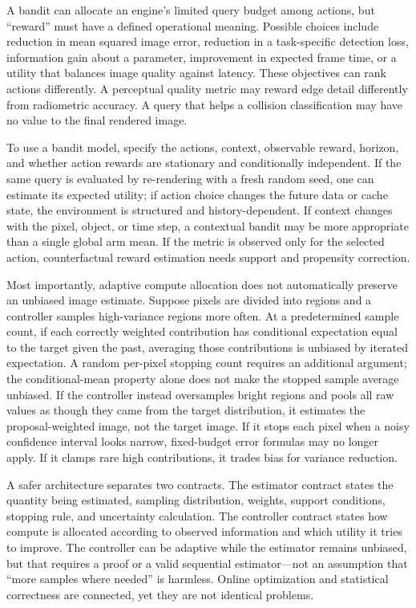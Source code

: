 \hypertarget{02-foundations-ii-ch029-a-compute-budget-needs-a-reward-that-matches-the-real-goal}{}

A bandit can allocate an engine's limited query budget among actions, but ``reward'' must have a defined operational meaning. Possible choices include reduction in mean squared image error, reduction in a task-specific detection loss, information gain about a parameter, improvement in expected frame time, or a utility that balances image quality against latency. These objectives can rank actions differently. A perceptual quality metric may reward edge detail differently from radiometric accuracy. A query that helps a collision classification may have no value to the final rendered image.

To use a bandit model, specify the actions, context, observable reward, horizon, and whether action rewards are stationary and conditionally independent. If the same query is evaluated by re-rendering with a fresh random seed, one can estimate its expected utility; if action choice changes the future data or cache state, the environment is structured and history-dependent. If context changes with the pixel, object, or time step, a contextual bandit may be more appropriate than a single global arm mean. If the metric is observed only for the selected action, counterfactual reward estimation needs support and propensity correction.

Most importantly, adaptive compute allocation does not automatically preserve an unbiased image estimate. Suppose pixels are divided into regions and a controller samples high-variance regions more often. At a predetermined sample count, if each correctly weighted contribution has conditional expectation equal to the target given the past, averaging those contributions is unbiased by iterated expectation. A random per-pixel stopping count requires an additional argument; the conditional-mean property alone does not make the stopped sample average unbiased. If the controller instead oversamples bright regions and pools all raw values as though they came from the target distribution, it estimates the proposal-weighted image, not the target image. If it stops each pixel when a noisy confidence interval looks narrow, fixed-budget error formulas may no longer apply. If it clamps rare high contributions, it trades bias for variance reduction.

A safer architecture separates two contracts. The estimator contract states the quantity being estimated, sampling distribution, weights, support conditions, stopping rule, and uncertainty calculation. The controller contract states how compute is allocated according to observed information and which utility it tries to improve. The controller can be adaptive while the estimator remains unbiased, but that requires a proof or a valid sequential estimator---not an assumption that ``more samples where needed'' is harmless. Online optimization and statistical correctness are connected, yet they are not identical problems.

